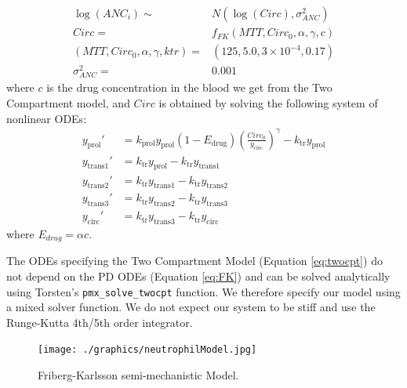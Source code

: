 \documentclass[11pt, reqno, oneside]{amsbook}
\numberwithin{equation}{chapter}
\numberwithin{figure}{chapter}
\numberwithin{table}{chapter}
\theoremstyle{remark}
\begin{document}
\begin{align}
  \log(ANC_i) \sim& N(\log(Circ), \sigma^2_{ANC})  \\
  Circ =& f_{FK}(MTT, Circ_{0}, \alpha, \gamma, c)  \\
  (MTT, Circ_{0}, \alpha, \gamma, ktr) =& (125, 5.0, 3 \times 10^{-4}, 0.17) \\
  \sigma^2_{ANC} =& 0.001
\end{align}
where \(c\) is the drug concentration in the blood we get from the Two
Compartment model, and \(Circ\) is obtained by solving the following
system of nonlinear ODEs:
\begin{subequations}
  \begin{align}
   y_\mathrm{prol}' &= k_\mathrm{prol} y_\mathrm{prol} (1 - E_\mathrm{drug})\left(\frac{Circ_0}{y_\mathrm{circ}}\right)^\gamma - k_\mathrm{tr}y_\mathrm{prol} \\
   y_\mathrm{trans1}' &= k_\mathrm{tr} y_\mathrm{prol} - k_\mathrm{tr} y_\mathrm{trans1} \\
   y_\mathrm{trans2}' &= k_\mathrm{tr} y_\mathrm{trans1} - k_\mathrm{tr} y_\mathrm{trans2}  \\
   y_\mathrm{trans3}' &= k_\mathrm{tr} y_\mathrm{trans2} - k_\mathrm{tr} y_\mathrm{trans3}  \\
   y_\mathrm{circ}' &= k_\mathrm{tr} y_\mathrm{trans3} - k_\mathrm{tr} y_\mathrm{circ}
   \end{align}
   \label{eq:FK}
\end{subequations}
where \(E_{drug}  = \alpha c\).

The ODEs specifying the Two Compartment Model
(Equation \eqref{eq:twocpt}) do not depend on the PD ODEs
(Equation \eqref{eq:FK}) and can be solved analytically
using Torsten's \texttt{pmx_solve_twocpt} function. We
therefore specify our model using a mixed solver function. We do not
expect our system to be stiff and use the Runge-Kutta 4th/5th order
integrator.

\begin{figure}[htbp]
\centering
\texttt{[image: ./graphics/neutrophilModel.jpg]}
\caption{\label{FK_model}
Friberg-Karlsson semi-mechanistic Model.}
\end{figure}
\end{document}
